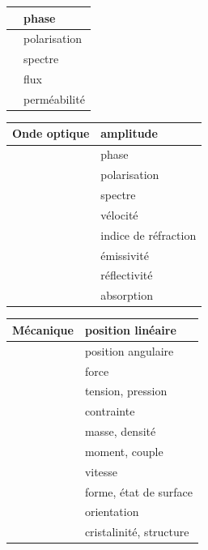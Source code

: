 \begin {center}
\begin{tabular}{|p{3cm}|p{7cm}|}
    \hline
               & phase        \\
    \hline
               & polarisation \\
    \hline
               & spectre      \\
    \hline
               & flux         \\
    \hline
               & perméabilité \\
    \hline
\end{tabular}
\begin{tabular}{|p{3cm}|p{7cm}|}
    Onde optique & amplitude            \\
    \hline
                 & phase                \\
    \hline
                 & polarisation         \\
    \hline
                 & spectre              \\
    \hline
                 & vélocité             \\
    \hline
                 & indice de réfraction \\
    \hline
                 & émissivité           \\
    \hline
                 & réflectivité         \\
    \hline
                 & absorption           \\
    \hline
\end{tabular}
\begin{tabular}{|p{3cm}|p{7cm}|}
    Mécanique & position linéaire       \\
    \hline
              & position angulaire      \\
    \hline
              & force                   \\
    \hline
              & tension, pression       \\
    \hline
              & contrainte              \\
    \hline
              & masse, densité          \\
    \hline
              & moment, couple          \\
    \hline
              & vitesse                 \\
    \hline
              & forme, état de surface  \\
    \hline
              & orientation             \\
    \hline
              & cristalinité, structure \\
    \hline
\end{tabular}

\end{center}
